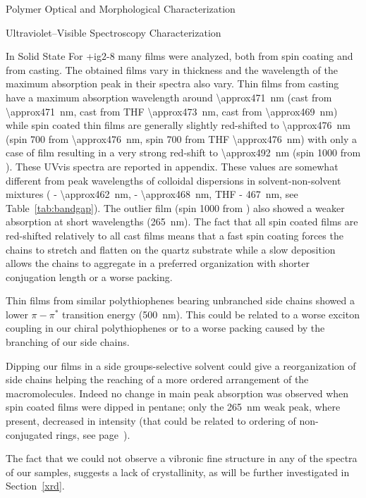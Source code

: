 \begin{section}{Polymer Optical and Morphological Characterization}
\begin{subsection}{Ultraviolet--Visible Spectroscopy Characterization}
\begin{subsubsection}{In Solid State}
\label{ig2-8-film}
For \cmpd+{ig2-8} many films were analyzed, both from spin coating and from casting. 
The obtained films vary in thickness and the wavelength of the maximum absorption peak in their spectra also vary. 
Thin films from casting have a maximum absorption wavelength around \SI{\approx471}{\nm} (cast from  \SI{\approx471}{\nm}, cast from \gls{THF} \SI{\approx473}{\nm}, cast from  \SI{\approx469}{\nm}) while spin coated thin films are generally slightly red-shifted to \SI{\approx476}{\nm} (spin \SI{700}{\rpm} from  \SI{\approx476}{\nm}, spin \SI{700}{\rpm} from \gls{THF} \SI{\approx476}{\nm}) with only a case of film resulting in a very strong red-shift to \SI{\approx492}{\nm} (spin \SI{1000}{\rpm} from ). These \gls{UVvis} spectra are reported in appendix. 
These values are somewhat different from peak wavelengths of colloidal dispersions in solvent-non-solvent mixtures ( -  \SI{\approx462}{\nm},  -  \SI{\approx468}{\nm}, \gls{THF} -  \SI{467}{\nm}, see Table~\ref{tab:bandgap}). The out\-lier film (spin \SI{1000}{\rpm} from ) also showed a weaker absorption at short wavelengths (\SI{265}{\nm}). The fact that all spin coated films are red-shifted relatively to all cast films 
means that a fast spin coating forces the chains to stretch and flatten on the quartz substrate while a slow deposition allows the chains to aggregate in a preferred organization with shorter conjugation length or a worse packing. 

Thin films from similar polythio\-phenes bearing unbranched side chains showed a lower $\pi-\pi^*$ transition energy (\SI{500}{\nm}). This could be related to a worse exciton coupling in our chiral polythio\-phenes or to a worse packing caused by the branching of our side chains.

\label{uvvis-pentane}
Dipping our films in a side groups-selective solvent could give a reorganization of side chains helping the reaching of a more ordered arrangement of the macromolecules. Indeed no change in main peak absorption was observed when spin coated films were dipped in pentane; only the \SI{265}{\nm} weak peak, where present, decreased in intensity (that could be related to ordering of non-conjugated rings, see page~\pageref{peak-265}). 

The fact that we could not observe a vibronic fine structure in any of the spectra of our samples, suggests a lack of crystallinity, as will be further 
investigated in Section~\ref{xrd}.


\end{subsubsection}
\end{subsection}
\end{section}
